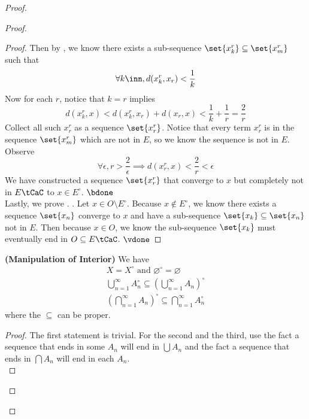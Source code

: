\documentclass{report}
\begin{document}
\begin{proof}
\begin{proof}
\begin{proof}
Then by , we know there exists a sub-sequence $\set{x^r_k}\subseteq \set{x^r_m}$ such that
\begin{equation*}
\forall k\inn, d(x^r_k,x_r)<\frac{1}{k}
\end{equation*}
Now for each $r$, notice that  $k=r$ implies
\begin{equation*}
d(x_k^r,x)<d(x^r_k,x_r)+d(x_r,x)<\frac{1}{k}+\frac{1}{r}=\frac{2}{r}
\end{equation*}
Collect all such $x_r^r$ as a sequence  $\set{x_r^r}$. Notice that every term $x_r^r$ is in the sequence $\set{x_m^r}$ which are not in $E$, so we know the sequence is not in $E$. Observe
 \begin{equation*}
\forall \epsilon, r>\frac{2}{\epsilon }\implies d(x_r^r,x)<\frac{2}{r}<\epsilon 
\end{equation*}
We have constructed a sequence $\set{x_r^r}$ that converge to $x$ but completely not in  $E\tCaC$ to $x\in E^\circ $. $\bdone$\\

Lastly, we prove . . Let $x\in O\setminus E^\circ $. Because $x\not\in E^\circ $, we know there exists a sequence $\set{x_n}$ converge to $x$ and have a sub-sequence  $\set{x_k}\subseteq \set{x_n}$ not in $E$. Then because $x\in O$, we know the sub-sequence $\set{x_k}$ must eventually end in $O\subseteq E\tCaC$. $\vdone$
\end{proof}
\begin{theorem}
\label{3.3.3}
\textbf{(Manipulation of Interior)} We have
\begin{gather*}
X=X^\circ\text{ and }\varnothing^\circ =\varnothing\\
\bigcup_{n=1}^\infty A_n^\circ \subseteq (\bigcup_{n=1}^\infty A_n)^\circ\\
(\bigcap _{n=1}^\infty A_n)^\circ \subseteq \bigcap _{n=1}^\infty A_n^\circ 
\end{gather*}
where the $\subseteq$ can be proper.
\end{theorem}
\begin{proof}
The first statement is trivial. For the second and the third, use the fact a sequence that ends in  some $A_n$ will end in  $\bigcup A_n$ and the fact a sequence that ends in $\bigcap A_n$ will end in each $A_n$.\\


\end{proof}
\end{proof}
\end{proof}
\end{document}
